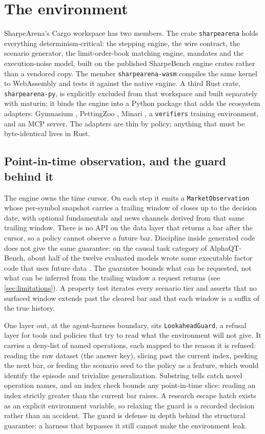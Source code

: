 \section{The environment}\label{sec:env}

SharpeArena's Cargo workspace has two members. The crate \texttt{sharpearena} holds everything determinism-critical: the stepping engine, the wire contract, the scenario generator, the limit-order-book matching engine, mandates and the execution-noise model, built on the published SharpeBench engine crates rather than a vendored copy. The member \texttt{sharpearena-wasm} compiles the same kernel to WebAssembly and tests it against the native engine. A third Rust crate, \texttt{sharpearena-py}, is explicitly excluded from that workspace and built separately with maturin; it binds the engine into a Python package that adds the ecosystem adapters: Gymnasium \citep{towers2024gymnasium}, PettingZoo \citep{terry2021pettingzoo}, Minari \citep{minari}, a \texttt{verifiers} training environment, and an MCP server. The adapters are thin by policy; anything that must be byte-identical lives in Rust.

\subsection{Point-in-time observation, and the guard behind it}\label{sec:leakfree}

The engine owns the time cursor. On each step it emits a \texttt{MarketObservation} whose per-symbol snapshot carries a trailing window of closes up to the decision date, with optional fundamentals and news channels derived from that same trailing window. There is no API on the data layer that returns a bar after the cursor, so a policy cannot observe a future bar. Discipline inside generated code does not give the same guarantee: on the causal task category of AlphaQT-Bench, about half of the twelve evaluated models wrote some executable factor code that uses future data \citep[p.~7]{luo2026alphaqt}. The guarantee bounds what can be requested, not what can be inferred from the trailing window a request returns (see \cref{sec:limitations}). A property test iterates every scenario tier and asserts that no surfaced window extends past the cleared bar and that each window is a suffix of the true history.

One layer out, at the agent-harness boundary, sits \texttt{LookaheadGuard}, a refusal layer for tools and policies that try to read what the environment will not give. It carries a deny-list of named operations, each mapped to the reason it is refused: reading the raw dataset (the answer key), slicing past the current index, peeking the next bar, or feeding the scenario seed to the policy as a feature, which would identify the episode and trivialize generalization. Substring tells catch novel operation names, and an index check bounds any point-in-time slice: reading an index strictly greater than the current bar raises. A research escape hatch exists as an explicit environment variable, so relaxing the guard is a recorded decision rather than an accident. The guard is defense in depth behind the structural guarantee: a harness that bypasses it still cannot make the environment leak.

